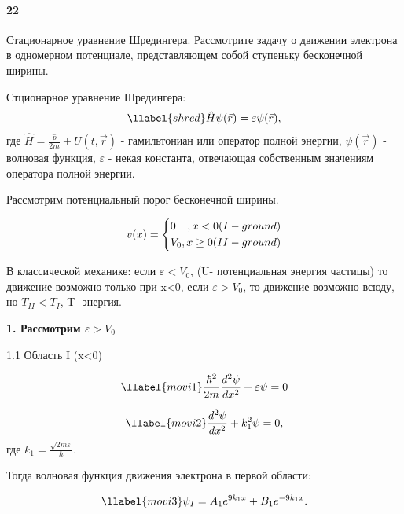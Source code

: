


\paragraph{22}
Стационарное уравнение Шредингера. Рассмотрите задачу о движении электрона в одномерном потенциале, представляющем собой ступеньку бесконечной ширины.

\begin{definition}
	Стционарное уравнение Шредингера: 
	\begin{gather}
	\llabel{shred}
	\hat{H}\psi(\vec{r})=\varepsilon\psi(\vec{r}), 
	\end{gather}
	где $\hat{H}=\frac{\hat{p}}{2m}+U(t,\vec{r})$ - гамильтониан или оператор полной энергии, $\psi(\vec{r})$ - волновая функция, $\varepsilon$ - некая константа,  отвечающая собственным значениям оператора полной энергии.
\end{definition}

Рассмотрим потенциальный порог бесконечной ширины.


$$
v(x)=
\left\{
\begin{gathered}
0\hfill ,x<0 (I - ground)\\
V_{0}\hfill, x\ge 0 (II - ground)\\
\end{gathered}
\right.
$$

В классической механике: если $\varepsilon<V_{0}$, (U- потенциальная энергия частицы) то движение возможно только при x<0, если $\varepsilon>V_{0}$, то движение возможно всюду, но $T_{II}<T_{I}$, T- энергия.

\textbf{1. Рассмотрим  $\varepsilon>V_{0}$ }

1.1 Область I (x<0)

\begin{gather}
\llabel{movi1}
\frac{\hbar^{2}}{2m}\frac{d^{2}\psi}{dx^{2}}+\varepsilon\psi=0
\end{gather}

\begin{gather}
\llabel{movi2}
\frac{d^{2}\psi}{dx^{2}}+k_{1}^{2}\psi=0,
\end{gather}
где $k_{1}=\frac{\sqrt{2m\varepsilon}}{\hbar}$.

Тогда волновая функция движения электрона в первой области:

\begin{gather}
\llabel{movi3}
\psi_{I}=A_{1}e^{9k_{1}x}+B_{1}e^{-9k_{1}x}.
\end{gather}

